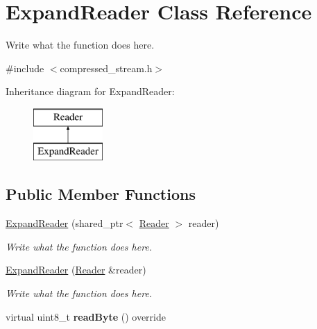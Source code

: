 \hypertarget{classExpandReader}{\section{Expand\+Reader Class Reference}
\label{classExpandReader}
}


Write what the function does here.  




{\ttfamily \#include $<$compressed\+\_\+stream.\+h$>$}

Inheritance diagram for Expand\+Reader\+:\begin{figure}[H]
\begin{center}
\leavevmode
\includegraphics[height=2.000000cm]{classExpandReader}
\end{center}
\end{figure}
\subsection*{Public Member Functions}
\begin{DoxyCompactItemize}
\item 
\hyperlink{classExpandReader_a6e08c2a0ddfcaf4039364a7d5b86c713}{Expand\+Reader} (shared\+\_\+ptr$<$ \hyperlink{classReader}{Reader} $>$ reader)
\begin{DoxyCompactList}\small\item\em Write what the function does here. \end{DoxyCompactList}\item 
\hyperlink{classExpandReader_acff92ec084cb738b0a072fcad2096e45}{Expand\+Reader} (\hyperlink{classReader}{Reader} \&reader)
\begin{DoxyCompactList}\small\item\em Write what the function does here. \end{DoxyCompactList}\item 
\hypertarget{classExpandReader_ad3339a664afce44dbba5ceb3cf9b6ebd}{virtual uint8\+\_\+t {\bfseries read\+Byte} () override}\label{classExpandReader_ad3339a664afce44dbba5ceb3cf9b6ebd}

\end{DoxyCompactItemize}

